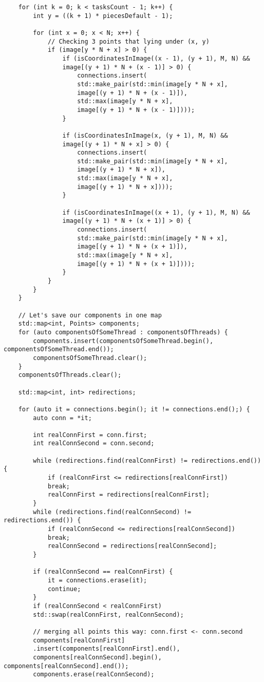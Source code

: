 \documentclass[14pt, russian]{extarticle}
\begin{document}
\begin{lstlisting}
	for (int k = 0; k < tasksCount - 1; k++) {
		int y = ((k + 1) * piecesDefault - 1);
		
		for (int x = 0; x < N; x++) {
			// Checking 3 points that lying under (x, y)
			if (image[y * N + x] > 0) {
				if (isCoordinatesInImage((x - 1), (y + 1), M, N) &&
				image[(y + 1) * N + (x - 1)] > 0) {
					connections.insert(
					std::make_pair(std::min(image[y * N + x],
					image[(y + 1) * N + (x - 1)]),
					std::max(image[y * N + x],
					image[(y + 1) * N + (x - 1)])));
				}
				
				if (isCoordinatesInImage(x, (y + 1), M, N) &&
				image[(y + 1) * N + x] > 0) {
					connections.insert(
					std::make_pair(std::min(image[y * N + x],
					image[(y + 1) * N + x]),
					std::max(image[y * N + x],
					image[(y + 1) * N + x])));
				}
				
				if (isCoordinatesInImage((x + 1), (y + 1), M, N) &&
				image[(y + 1) * N + (x + 1)] > 0) {
					connections.insert(
					std::make_pair(std::min(image[y * N + x],
					image[(y + 1) * N + (x + 1)]),
					std::max(image[y * N + x],
					image[(y + 1) * N + (x + 1)])));
				}
			}
		}
	}
	
	// Let's save our components in one map
	std::map<int, Points> components;
	for (auto componentsOfSomeThread : componentsOfThreads) {
		components.insert(componentsOfSomeThread.begin(), componentsOfSomeThread.end());
		componentsOfSomeThread.clear();
	}
	componentsOfThreads.clear();
	
	std::map<int, int> redirections;
	
	for (auto it = connections.begin(); it != connections.end();) {
		auto conn = *it;
		
		int realConnFirst = conn.first;
		int realConnSecond = conn.second;
		
		while (redirections.find(realConnFirst) != redirections.end()) {
			if (realConnFirst <= redirections[realConnFirst])
			break;
			realConnFirst = redirections[realConnFirst];
		}
		while (redirections.find(realConnSecond) != redirections.end()) {
			if (realConnSecond <= redirections[realConnSecond])
			break;
			realConnSecond = redirections[realConnSecond];
		}
		
		if (realConnSecond == realConnFirst) {
			it = connections.erase(it);
			continue;
		}
		if (realConnSecond < realConnFirst)
		std::swap(realConnFirst, realConnSecond);
		
		// merging all points this way: conn.first <- conn.second
		components[realConnFirst]
		.insert(components[realConnFirst].end(),
		components[realConnSecond].begin(), components[realConnSecond].end());
		components.erase(realConnSecond);
		

\end{lstlisting}
\end{document}
